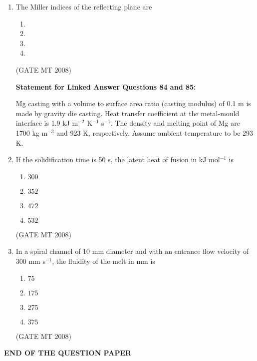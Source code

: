 \documentclass[11pt, letterpaper]{article}
\theoremstyle{remark}
\begin{document}
\begin{enumerate}[label=Q.\arabic*]
    \item The Miller indices of the reflecting plane are
    \vspace{-0.9em}
    \begin{multicols}{4}
        \begin{enumerate}[label=(\MakeUppercase{\alph*})]
            \item {}
            \item {}
            \item {}
            \item {}
        \end{enumerate}
    \end{multicols}
\hfill(GATE MT 2008)\\
    \vspace{0.5em}

    
    \textbf{Statement for Linked Answer Questions 84 and 85:}

    Mg casting with a volume to surface area ratio (casting modulus) of 0.1 m is made by gravity die casting.
    Heat transfer coefficient at the metal-mould interface is 1.9 kJ m$^{-2}$ K$^{-1}$ s$^{-1}$. 
    The density and melting point of Mg are 1700 kg m$^{-3}$ and 923 K, respectively. 
    Assume ambient temperature to be 293 K.

    \item If the solidification time is 50 s, the latent heat of fusion in kJ mol$^{-1}$ is
    \vspace{-0.9em}
    \begin{multicols}{4}
        \begin{enumerate}[label=(\MakeUppercase{\alph*})]
            \item $300$
            \item $352$
            \item $472$
            \item $532$
        \end{enumerate}
    \end{multicols}
    \vspace{-5mm}
\hfill(GATE MT 2008)

\item In a spiral channel of 10 mm diameter and with an entrance flow velocity of 300 mm s$^{-1}$, the fluidity of the melt in mm is
    \vspace{-0.9em}
    \begin{multicols}{4}
        \begin{enumerate}[label=(\MakeUppercase{\alph*})]
            \item $75$
            \item $175$
            \item $275$
            \item $375$
        \end{enumerate}
    \end{multicols}
\hfill(GATE MT 2008)
\end{enumerate}

\textbf{END OF THE QUESTION PAPER}
\end{document}
